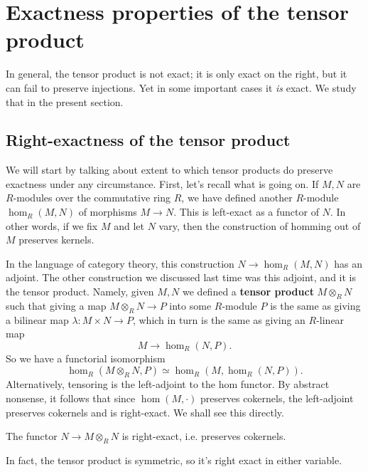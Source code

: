 \section{Exactness properties of the tensor product}

In general, the tensor product is not exact; it is only exact on the right,
but it can fail to preserve injections. Yet in some important cases it
\emph{is}
exact. We study that in the present section.

\subsection{Right-exactness of the tensor product}

We will start by talking about extent to which tensor products do preserve
exactness under any circumstance.
First, let's recall what is going on. If $M,N$ are $R$-modules over the
commutative ring $R$, we have defined another $R$-module $\hom_R(M,N)$
of morphisms
$M \to N$. This is left-exact as a functor of $N$. In other words, if we fix
$M$ and let $N$ vary, then the construction of homming out of $M$ preserves
kernels.

In the language of category theory, this construction $N \to \hom_R(M,N)$ has
an adjoint. The other construction we discussed last time was this adjoint,
and it is  the tensor
product. Namely, given $M,N$ we defined a \textbf{tensor product} $M \otimes_R
N$ such that giving a map $M \otimes_R N \to P$ into some $R$-module $P$
is the same as giving a
bilinear map $\lambda: M \times N \to P$, which in turn is the same as giving
an $R$-linear map
\[ M \to \hom_R(N, P).	\]
So we have a functorial isomorphism
\[ \hom_R(M \otimes_R N, P) \simeq \hom_R(M, \hom_R(N,P)).  \]
Alternatively, tensoring is the left-adjoint to the
hom functor. By abstract nonsense, it follows that since $\hom(M, \cdot)$
preserves cokernels, the left-adjoint preserves cokernels and is right-exact.
We shall see this directly.

\begin{proposition}
The functor $N \to M \otimes_R N$ is right-exact, i.e. preserves cokernels.
\end{proposition}
In fact, the tensor product is symmetric, so it's right exact in either
variable.

